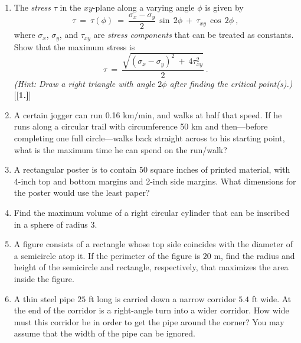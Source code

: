 {\begin{enumerate}[\bfseries 1.]
\begin{displaymath}
 \end{displaymath}
 with $E$, $r_0$, and $x_0$ treated as constants. For which value of $r$
 is the power $P$ maximized?
 \item The \emph{stress} $\tau$ in the $xy$-plane along a varying angle $\phi$ is given by
 \begin{displaymath}
  \tau ~=~ \tau(\phi) ~=~ \frac{\sigma_x - \sigma_y}{2}\,\sin\,2\phi ~+~ \tau_{xy}\,\cos\,2\phi ~,
 \end{displaymath}
 where $\sigma_x$, $\sigma_y$, and $\tau_{xy}$ are \emph{stress components} that can be
 treated as constants. Show that the maximum stress is
 \begin{displaymath}
  \tau ~=~ \frac{\sqrt{\left(\sigma_x - \sigma_y\right)^2 ~+~ 4 \tau^2_{xy}}}{2} ~.
 \end{displaymath}
 \emph{(Hint: Draw a right triangle with angle $2\phi$ after finding the critical point(s).)}
[{[\bfseries 1.]}]
 \item A certain jogger can run 0.16 km/min, and walks at half that speed. If he
  runs along a circular trail with circumference 50 km and then---before
  completing one full circle---walks back straight across to his starting point,
  what is the maximum time he can spend on the run/walk?
 \item A rectangular poster is to contain 50 square inches of printed material,
  with 4-inch top and bottom margins and 2-inch side margins. What dimensions for
  the poster would use the least paper?
 \item Find the maximum volume of a right circular cylinder that can be
  inscribed in a sphere of radius $3$.
 \item A figure consists of a rectangle whose top side coincides with the
  diameter of a semicircle atop it. If the perimeter of the figure is $20$ m,
  find the radius and height of the semicircle and rectangle, respectively, that
  maximizes the area inside the figure.
 \item A thin steel pipe $25$ ft long is carried down a narrow corridor $5.4$ ft
 wide. At the end of the corridor is a right-angle turn into a wider corridor.
 How wide must this corridor be in order to get the pipe around the corner? You
 may assume that the width of the pipe can be ignored.
\end{enumerate}}
